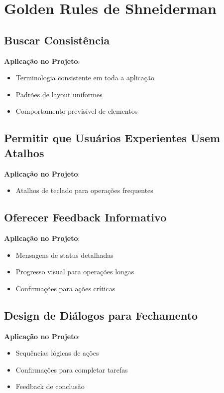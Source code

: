 \section{Golden Rules de Shneiderman}

\subsection{Buscar Consistência}

\textbf{Aplicação no Projeto}:
\begin{itemize}
    \item Terminologia consistente em toda a aplicação
    \item Padrões de layout uniformes
    \item Comportamento previsível de elementos
\end{itemize}

\subsection{Permitir que Usuários Experientes Usem Atalhos}

\textbf{Aplicação no Projeto}:
\begin{itemize}
    \item Atalhos de teclado para operações frequentes
\end{itemize}

\subsection{Oferecer Feedback Informativo}

\textbf{Aplicação no Projeto}:
\begin{itemize}
    \item Mensagens de status detalhadas
    \item Progresso visual para operações longas
    \item Confirmações para ações críticas
\end{itemize}

\subsection{Design de Diálogos para Fechamento}

\textbf{Aplicação no Projeto}:
\begin{itemize}
    \item Sequências lógicas de ações
    \item Confirmações para completar tarefas
    \item Feedback de conclusão
\end{itemize}

